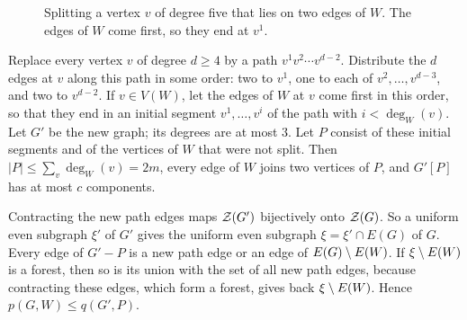 \documentclass[11pt]{article}
\begin{document}
\begin{figure}[ht]
\centering
{}
\caption{Splitting a vertex $v$ of degree five that lies on two edges of $W$. The edges of $W$
come first, so they end at $v^{1}$.}
\label{fig:split}
\end{figure}

 Replace every vertex $v$ of degree $d\ge4$ by a path $v^{1}v^{2}\cdots v^{d-2}$.
Distribute the $d$ edges at $v$ along this path in some order: two to $v^{1}$, one to each of
$v^{2},\dots,v^{d-3}$, and two to $v^{d-2}$. If $v\in V(W)$, let the edges of $W$ at $v$ come first
in this order, so that they end in an initial segment $v^{1},\dots,v^{i}$ of the path with
$i<\deg_W(v)$. Let $G'$ be the new graph; its degrees are at most $3$. Let $P$ consist of these
initial segments and of the vertices of $W$ that were not split. Then $|P|\le\sum_v\deg_W(v)=2m$,
every edge of $W$ joins two vertices of $P$, and $G'[P]$ has at most $c$ components.

Contracting the new path edges maps $\mathcal{Z}(G')$ bijectively onto $\mathcal{Z}(G)$. So a uniform even subgraph
$\xi'$ of $G'$ gives the uniform even subgraph $\xi=\xi'\cap E(G)$ of $G$. Every edge of $G'-P$
is a new path edge or an edge of $E(G)\setminus E(W)$. If $\xi\setminus E(W)$ is a forest, then so is its
union with the set of all new path edges, because contracting these edges, which form a forest,
gives back $\xi\setminus E(W)$. Hence $p(G,W)\le q(G',P)$.
\end{document}
